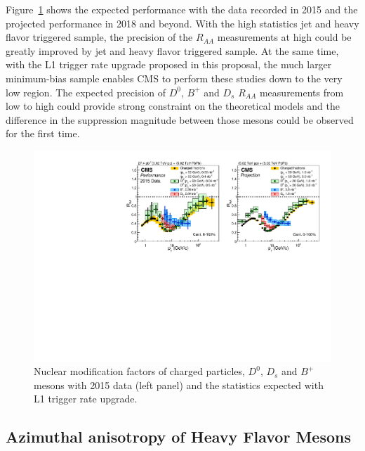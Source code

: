Figure~\ref{fig:RAA_2015} shows the expected performance with the data recorded in 2015 and the projected performance in 2018 and beyond. With the high statistics jet and heavy flavor triggered sample, the precision of the $R_{AA}$ measurements at high \pt could be greatly improved by jet and heavy flavor triggered sample. At the same time, with the L1 trigger rate upgrade proposed in this proposal, the much larger minimum-bias sample enables CMS to perform these studies down to the very low \pt region. The expected precision of $D^0$, $B^+$ and $D_s$ $R_{AA}$ measurements from low \pt to high \pt could provide strong constraint on the theoretical models and the difference in the suppression magnitude between those mesons could be observed for the first time.


\begin{figure}[!ht]
\begin{center}
\includegraphics[width=.98\textwidth]{figures/cRAA_lumiTG_3_lumiMB_1_v2.pdf}
\caption{Nuclear modification factors of charged particles, $D^0$, $D_s$ and $B^+$ mesons with 2015 data (left panel) and the statistics expected with L1 trigger rate upgrade.}
\label{fig:RAA_2015}
\end{center}
\end{figure}

\subsection{Azimuthal anisotropy of Heavy Flavor Mesons}

